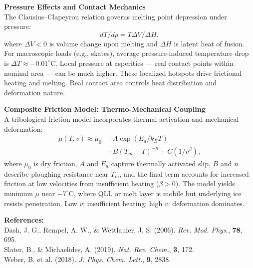 \begin{technical}
\textbf{Pressure Effects and Contact Mechanics}\\[0.5em]
The Clausius–Clapeyron relation governs melting point depression under pressure:
\[
dT/dp = T \Delta V/\Delta H,
\]
where $\Delta V < 0$ is volume change upon melting and $\Delta H$ is latent heat of fusion. For macroscopic loads (e.g., skates), average pressure-induced temperature drop is $\Delta T \approx -0.01^\circ$C. Local pressure at asperities — real contact points within nominal area — can be much higher. These localized hotspots drive frictional heating and melting. Real contact area controls heat distribution and deformation nature.

\textbf{Composite Friction Model: Thermo-Mechanical Coupling}\\[0.5em]
A tribological friction model incorporates thermal activation and mechanical deformation:
\begin{align}
    \mu(T, v) \approx \mu_0 &+ A \exp\left(E_a/k_B T\right) \\&+ B (T_m - T)^{-n} + C \left( 1/v^\beta \right),
\end{align}
where $\mu_0$ is dry friction, $A$ and $E_a$ capture thermally activated slip, $B$ and $n$ describe ploughing resistance near $T_m$, and the final term accounts for increased friction at low velocities from insufficient heating ($\beta > 0$). The model yields minimum $\mu$ near $-7^\circ$C, where QLL or melt layer is mobile but underlying ice resists penetration. Low $v$: insufficient heating; high $v$: deformation dominates.

\vspace{0.5em}
\textbf{References:}\\
Dash, J. G., Rempel, A. W., \& Wettlaufer, J. S. (2006). \textit{Rev. Mod. Phys.}, \textbf{78}, 695.\\
Slater, B., \& Michaelides, A. (2019). \textit{Nat. Rev. Chem.}, \textbf{3}, 172.\\
Weber, B. et al. (2018). \textit{J. Phys. Chem. Lett.}, \textbf{9}, 2838.

\end{technical}
